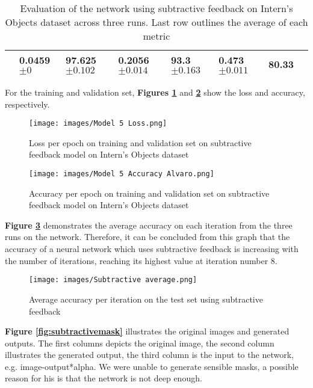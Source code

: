 \documentclass{l4proj}
\begin{document}
\begin{table}[H]
\begin{tabular}{|l|l|l|l|l|l|l|l|}
                                                          & 0.0459 $\pm 0$ 
            & 97.625 $\pm 0.102 $                                                                 & 0.2056 $\pm 0.014$                                                            & 93.3 $\pm 0.163$                                                          & 0.473 $\pm 0.011$          & 80.33                                                          \\ \hline
\end{tabular}
\caption{Evaluation of the network using subtractive feedback on Intern's Objects dataset across three runs. Last row outlines the average of each metric}
\label{tab:subtractive}
\end{table}

For the training and validation set, \textbf{Figures \ref{fig:subtractiveloss}} and \textbf{\ref{fig:subtractiveaccuracy}} show the loss and accuracy, respectively.

\begin{figure}[H]
    \centering
    \texttt{[image: images/Model 5 Loss.png]}
    \caption{Loss per epoch on training and validation set on subtractive feedback model on Intern's Objects dataset}
    \label{fig:subtractiveloss} 
\end{figure}

\begin{figure}[H]
    \centering
    \texttt{[image: images/Model 5 Accuracy Alvaro.png]}
    \caption{Accuracy per epoch on training and validation set on subtractive feedback model on Intern's Objects dataset}
    \label{fig:subtractiveaccuracy} 
\end{figure}

\textbf{Figure \ref{fig:subtrav}} demonstrates the average accuracy on each iteration from the three runs on the network. Therefore, it can be concluded from this graph that the accuracy of a neural network which uses subtractive feedback is increasing with the number of iterations, reaching its highest value at iteration number 8.

\begin{figure}[H]
    \centering
    \texttt{[image: images/Subtractive average.png]}
    \caption{Average accuracy per iteration on the test set using subtractive feedback}
    \label{fig:subtrav} 
\end{figure}

\textbf{Figure \ref{fig:subtractivemask}} illustrates the original images and generated outputs. The first columns depicts the original image, the second column illustrates the generated output, the third column is the input to the network, e.g. image-output*alpha. We were unable to generate sensible masks, a possible reason for his is that the network is not deep enough.
\end{document}

